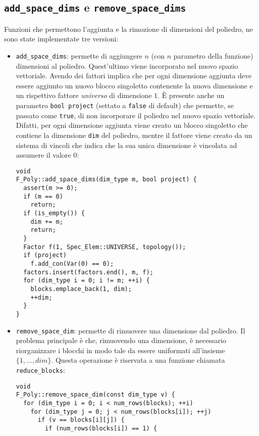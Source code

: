 \documentclass{mimosis}
\theoremstyle{definition}
\begin{document}
\subsection{\texttt{add\_space\_dims} e \texttt{remove\_space\_dims}}
\label{sec:orga9c39ed}
Funzioni che permettono l'aggiunta e la rimozione di dimensioni del poliedro, ne
sono state implementate tre versioni:

\begin{itemize}
\item \texttt{add\_space\_dims}: permette di aggiungere \(n\) (con \(n\) parametro della
funzione) dimensioni al poliedro.
Quest'ultimo viene incorporato nel nuovo spazio vettoriale. Avendo dei fattori
implica che per ogni dimensione aggiunta deve essere aggiunto un nuovo blocco
singoletto contenente la nuova dimensione e un rispettivo fattore \emph{universo}
di dimensione \(1\). È presente anche un parametro \texttt{bool project} (settato a
\texttt{false} di default) che permette, se passato come \texttt{true}, di non incorporare il
poliedro nel nuovo spazio vettoriale. Difatti, per ogni dimensione aggiunta
viene creato un blocco singoletto che contiene la dimensione \texttt{dim} del
poliedro, mentre il fattore viene creato da un sistema di vincoli che indica
che la sua unica dimensione è vincolata ad assumere il valore 0:
\lstset{style=mystyle,language=C++,label= ,caption= ,captionpos=b,numbers=none}
\begin{lstlisting}
void
F_Poly::add_space_dims(dim_type m, bool project) {
  assert(m >= 0);
  if (m == 0)
    return;
  if (is_empty()) {
    dim += m;
    return;
  }
  Factor f(1, Spec_Elem::UNIVERSE, topology());
  if (project)
    f.add_con(Var(0) == 0);
  factors.insert(factors.end(), m, f);
  for (dim_type i = 0; i != m; ++i) {
    blocks.emplace_back(1, dim);
    ++dim;
  }
}
\end{lstlisting}
\item \texttt{remove\_space\_dim}: permette di rimuovere una dimensione dal poliedro. Il
problema principale è che, rimuovendo una dimensione, è necessario
riorganizzare i blocchi in modo tale da essere uniformati all'insieme
\(\{1,...,dim\}\). Questa operazione è riservata a una funzione chiamata
\texttt{reduce\_blocks}:
\lstset{style=mystyle,language=C++,label= ,caption= ,captionpos=b,numbers=none}
\begin{lstlisting}
void
F_Poly::remove_space_dim(const dim_type v) {
  for (dim_type i = 0; i < num_rows(blocks); ++i)
    for (dim_type j = 0; j < num_rows(blocks[i]); ++j)
      if (v == blocks[i][j]) {
        if (num_rows(blocks[i]) == 1) {

\end{lstlisting}
\end{itemize}
\end{document}
